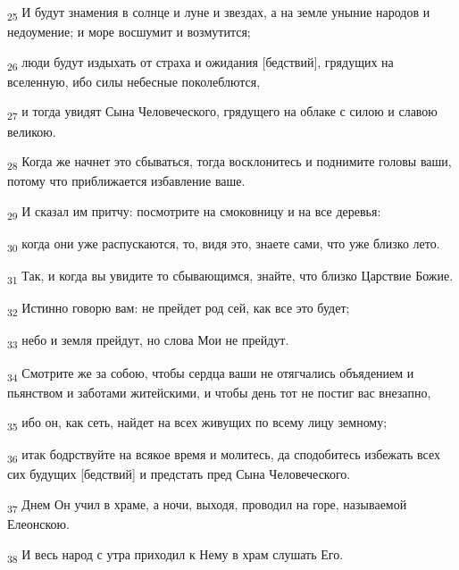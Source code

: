 \begin{tcolorbox}
\textsubscript{25} И будут знамения в солнце и луне и звездах, а на земле уныние народов и недоумение; и море восшумит и возмутится;
\end{tcolorbox}
\begin{tcolorbox}
\textsubscript{26} люди будут издыхать от страха и ожидания [бедствий], грядущих на вселенную, ибо силы небесные поколеблются,
\end{tcolorbox}
\begin{tcolorbox}
\textsubscript{27} и тогда увидят Сына Человеческого, грядущего на облаке с силою и славою великою.
\end{tcolorbox}
\begin{tcolorbox}
\textsubscript{28} Когда же начнет это сбываться, тогда восклонитесь и поднимите головы ваши, потому что приближается избавление ваше.
\end{tcolorbox}
\begin{tcolorbox}
\textsubscript{29} И сказал им притчу: посмотрите на смоковницу и на все деревья:
\end{tcolorbox}
\begin{tcolorbox}
\textsubscript{30} когда они уже распускаются, то, видя это, знаете сами, что уже близко лето.
\end{tcolorbox}
\begin{tcolorbox}
\textsubscript{31} Так, и когда вы увидите то сбывающимся, знайте, что близко Царствие Божие.
\end{tcolorbox}
\begin{tcolorbox}
\textsubscript{32} Истинно говорю вам: не прейдет род сей, как все это будет;
\end{tcolorbox}
\begin{tcolorbox}
\textsubscript{33} небо и земля прейдут, но слова Мои не прейдут.
\end{tcolorbox}
\begin{tcolorbox}
\textsubscript{34} Смотрите же за собою, чтобы сердца ваши не отягчались объядением и пьянством и заботами житейскими, и чтобы день тот не постиг вас внезапно,
\end{tcolorbox}
\begin{tcolorbox}
\textsubscript{35} ибо он, как сеть, найдет на всех живущих по всему лицу земному;
\end{tcolorbox}
\begin{tcolorbox}
\textsubscript{36} итак бодрствуйте на всякое время и молитесь, да сподобитесь избежать всех сих будущих [бедствий] и предстать пред Сына Человеческого.
\end{tcolorbox}
\begin{tcolorbox}
\textsubscript{37} Днем Он учил в храме, а ночи, выходя, проводил на горе, называемой Елеонскою.
\end{tcolorbox}
\begin{tcolorbox}
\textsubscript{38} И весь народ с утра приходил к Нему в храм слушать Его.
\end{tcolorbox}

